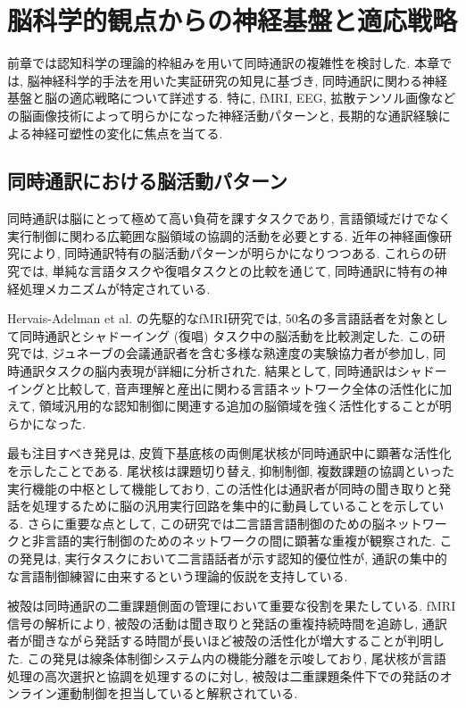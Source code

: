 \section{脳科学的観点からの神経基盤と適応戦略}

前章では認知科学の理論的枠組みを用いて同時通訳の複雑性を検討した.
本章では, 脳神経科学的手法を用いた実証研究の知見に基づき, 同時通訳に関わる神経基盤と脳の適応戦略について詳述する.
特に, fMRI, EEG, 拡散テンソル画像などの脳画像技術によって明らかになった神経活動パターンと, 長期的な通訳経験による神経可塑性の変化に焦点を当てる.

\subsection{同時通訳における脳活動パターン}

同時通訳は脳にとって極めて高い負荷を課すタスクであり, 言語領域だけでなく実行制御に関わる広範囲な脳領域の協調的活動を必要とする.
近年の神経画像研究により, 同時通訳特有の脳活動パターンが明らかになりつつある.
これらの研究では, 単純な言語タスクや復唱タスクとの比較を通じて, 同時通訳に特有の神経処理メカニズムが特定されている.

Hervais-Adelman et al. \cite{hervais2015fmri} の先駆的なfMRI研究では, 50名の多言語話者を対象として同時通訳とシャドーイング (復唱) タスク中の脳活動を比較測定した.
この研究では, ジュネーブの会議通訳者を含む多様な熟達度の実験協力者が参加し, 同時通訳タスクの脳内表現が詳細に分析された.
結果として, 同時通訳はシャドーイングと比較して, 音声理解と産出に関わる言語ネットワーク全体の活性化に加えて, 領域汎用的な認知制御に関連する追加の脳領域を強く活性化することが明らかになった.

最も注目すべき発見は, 皮質下基底核の両側尾状核が同時通訳中に顕著な活性化を示したことである.
尾状核は課題切り替え, 抑制制御, 複数課題の協調といった実行機能の中枢として機能しており, この活性化は通訳者が同時の聞き取りと発話を処理するために脳の汎用実行回路を集中的に動員していることを示している.
さらに重要な点として, この研究では二言語言語制御のための脳ネットワークと非言語的実行制御のためのネットワークの間に顕著な重複が観察された.
この発見は, 実行タスクにおいて二言語話者が示す認知的優位性が, 通訳の集中的な言語制御練習に由来するという理論的仮説を支持している.

被殻は同時通訳の二重課題側面の管理において重要な役割を果たしている.
fMRI信号の解析により, 被殻の活動は聞き取りと発話の重複持続時間を追跡し, 通訳者が聞きながら発話する時間が長いほど被殻の活性化が増大することが判明した.
この発見は線条体制御システム内の機能分離を示唆しており, 尾状核が言語処理の高次選択と協調を処理するのに対し, 被殻は二重課題条件下での発話のオンライン運動制御を担当していると解釈されている.

